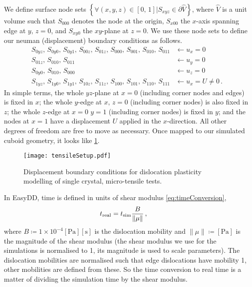 We define surface node sets $\left\{\forall (x, y, z) \in [0,\, 1] \vert S_{xyz} \in \partial \hat{V}\right\}$, where $\hat{V}$ is a unit volume such that $S_{000}$ denotes the node at the origin, $S_{x00}$ the $x$-axis spanning edge at $y,\, z=0$, and $S_{xy0}$ the $xy$-plane at $z=0$. We use these node sets to define our neuman (displacement) boundary conditions as follows.
\begin{subequations}
    \begin{align}
        S_{0yz},\, S_{0y0},\, S_{0y1},\, S_{00z},\, S_{01z},\, S_{000},\, S_{001},\, S_{010},\, S_{011} & \gets u_x = 0           \\
        S_{01z},\, S_{010},\, S_{011}                                                                   & \gets u_y = 0           \\
        S_{0y0},\, S_{010},\, S_{000}                                                                   & \gets u_z = 0           \\
        S_{1yz},\, S_{1y0},\, S_{1y1},\, S_{10z},\, S_{11z},\, S_{100},\, S_{101},\, S_{110},\, S_{111} & \gets u_x = U \neq 0\,.
    \end{align}
\end{subequations}
In simple terms, the whole $yz$-plane at $x=0$ (including corner nodes and edges) is fixed in $x$; the whole $y$-edge at $x,\,z=0$ (including corner nodes) is also fixed in $z$; the whole $z$-edge at $x = 0\,\, y = 1$ (including corner nodes) is fixed in $y$; and the nodes at $x=1$ have a displacement $U$ applied in the $x$-direction. All other degrees of freedom are free to move as necessary. Once mapped to our simulated cuboid geometry, it looks like \cref{f:tensileSetup}.
\begin{figure}
    \centering
    \texttt{[image: tensileSetup.pdf]}
    \caption[Displacement boundary conditions for dislocation plasticity modelling of single crystal, micro-tensile tests.]{Displacement boundary conditions for dislocation plasticity modelling of single crystal, micro-tensile tests.}
    \label{f:tensileSetup}
\end{figure}

In EasyDD, time is defined in units of shear modulus \cref{eq:timeConversion},
\begin{align}\label{eq:timeConversion}
    t_{\textrm{real}} & = t_{\textrm{sim}} \dfrac{B}{\lVert\mu\rVert}\,,
\end{align}
where $B \coloneqq 1 \times 10^{-4}[\si{\pascal}][\si{\second}]$ is the dislocation mobility and $\lVert\mu\rVert \coloneqq [\si{\pascal}]$ is the magnitude of the shear modulus (the shear modulus we use for the simulations is normalised to 1, its magnitude is used to scale parameters). The dislocation mobilities are normalised such that edge dislocations have mobility 1, other mobilities are defined from these. So the time conversion to real time is a matter of dividing the simulation time by the shear modulus.

